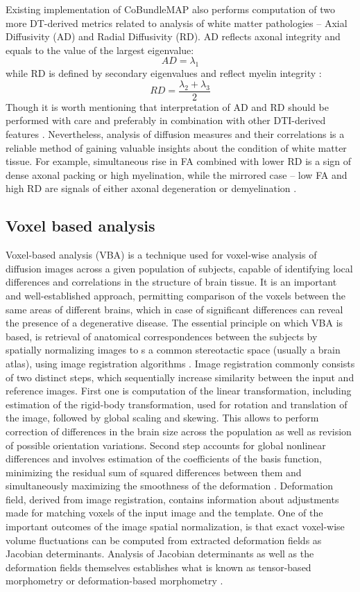 \documentclass[thesis.tex]{subfiles}
\begin{document}
Existing implementation of CoBundleMAP also performs computation of two more DT-derived metrics related to analysis of white matter pathologies \cite{dtiGeneralGood} -- Axial Diffusivity (AD) and Radial Diffusivity (RD). AD reflects axonal integrity and \cite{RDmyelination} equals to the value of the largest eigenvalue:
\[AD = \lambda_1\]
while RD is defined by secondary eigenvalues and reflect myelin integrity \cite{RDmyelination}:
\[RD = \frac{\lambda_2 + \lambda_3}{2}\]
Though it is worth mentioning that interpretation of AD and RD should be performed with care and preferably in combination with other DTI-derived features \cite{rd-ad-crit}.
Nevertheless, analysis of diffusion measures and their correlations is a reliable method of gaining valuable insights about the condition of white matter tissue. For example, simultaneous rise in FA combined with lower RD is a sign of dense axonal packing or high myelination, while the mirrored case -- low FA and high RD are signals of either axonal degeneration or demyelination \cite{fa-fd-correlation}.
\subsection{Voxel based analysis}

Voxel-based analysis (VBA) is a technique used for voxel-wise analysis of diffusion images across a given population of subjects, capable of identifying local differences and correlations in the structure of brain tissue. It is an important and well-established approach, permitting comparison of the voxels between the same areas of different brains, which in case of significant differences can reveal the presence of a degenerative disease. The essential principle on which VBA is based, is retrieval of anatomical correspondences between the subjects by spatially normalizing images to s a common stereotactic space (usually a brain atlas), using image registration algorithms \cite{vbaMechelli}. Image registration commonly consists of two distinct steps, which sequentially increase similarity between the input and reference images. First one is computation of the linear transformation, including estimation of the rigid-body transformation, used for rotation and translation of the image, followed by global scaling and skewing. This allows to perform correction of differences in the brain size across the population as well as revision of possible orientation variations. Second step accounts for global nonlinear differences and involves estimation of the coefficients of the basis function, minimizing the residual sum of squared differences between them and simultaneously maximizing the smoothness of the deformation \cite{vbaAshburner}. Deformation field, derived from image registration, contains information about adjustments made for matching voxels of the input image and the template. One of the important outcomes of the image spatial normalization, is that exact voxel-wise volume fluctuations can be computed from extracted deformation fields as Jacobian determinants. Analysis of Jacobian determinants as well as the deformation fields themselves establishes what is known as tensor-based morphometry or deformation-based morphometry \cite{vbaKurth}.
\end{document}
